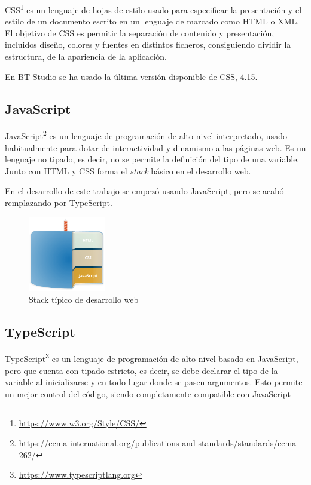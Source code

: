 CSS\footnote{\url{https://www.w3.org/Style/CSS/}} es un lenguaje de hojas de estilo usado para especificar la presentación y el estilo de un documento escrito en un lenguaje de marcado como HTML o XML. El objetivo de CSS es permitir la separación de contenido y presentación, incluidos diseño, colores y fuentes en distintos ficheros, consiguiendo dividir la estructura, de la apariencia de la aplicación.

En BT Studio se ha usado la última versión disponible de CSS, 4.15.

\subsection{JavaScript}

JavaScript\footnote{\url{https://ecma-international.org/publications-and-standards/standards/ecma-262/}} es un lenguaje de programación de alto nivel interpretado, usado habitualmente para dotar de interactividad y dinamismo a las páginas web. Es un lenguaje no tipado, es decir, no se permite la definición del tipo de una variable. Junto con HTML y CSS forma el \textit{stack} básico en el desarrollo web.

En el desarrollo de este trabajo se empezó usando JavaScript, pero se acabó remplazando por TypeScript.

\begin{figure}[H]
    \centering
    \includegraphics[width=0.3\textwidth]{figures/web_stack.png}
    \caption{Stack típico de desarrollo web}
    \label{fig:ejemplo}
\end{figure}

\subsection{TypeScript}
TypeScript\footnote{\url{https://www.typescriptlang.org}} es un lenguaje de programación de alto nivel basado en JavaScript, pero que cuenta con tipado estricto, es decir, se debe declarar el tipo de la variable al inicializarse y en todo lugar donde se pasen argumentos. Esto permite un mejor control del código, siendo completamente compatible con JavaScript

